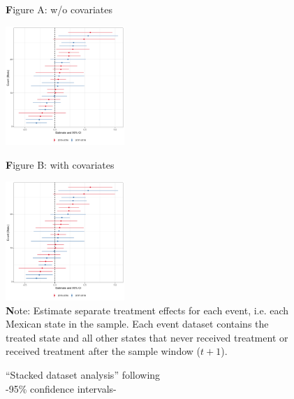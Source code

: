 \documentclass[12pt]{amsart}
\numberwithin{equation}{section}
\theoremstyle{definition}
\theoremstyle{definition}
\theoremstyle{definition}
\begin{document}
\begin{appendix}
\begin{figure}[H]
\begin{center} 
	{\textbf Figure A: w/o covariates }
\end{center}
\includegraphics[width=0.4\textwidth]{Figures/CDLZ.png}
\begin{center} 
	{\textbf Figure B: with covariates } 
\end{center}
\includegraphics[width=0.4\textwidth]{Figures/CDLZ_cov.png}
       \captionsetup{justification=centering}
       \\
 {\textbf Note:} Estimate separate treatment effects for each event, i.e. each Mexican state in the sample. Each event dataset contains the treated state and all other states that never received treatment or received treatment after the sample window ($t+1$).   
\end{figure}    

\begin{figure}[H]
\centering
\caption{``Stacked dataset analysis'' following \citet{cengiz_etal_2019}\\ -95\% confidence intervals-} 
\label{fig:stacked_wcontrols}


\end{figure}
\end{appendix}
\end{document}
